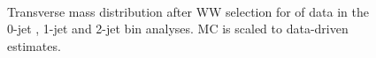 \begin{figure}[!hbtp]
\centering
{}
\\
\caption{Transverse mass distribution after WW selection for \intlumi of data in the 0-jet , 
1-jet  and 2-jet  bin analyses. 
MC is scaled to data-driven estimates.}
\label{fig:ww_mt}
\end{figure}

